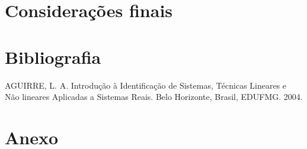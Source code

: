 \documentclass[a4paper, 12pt]{article}
\begin{document}
\newpage
\section{Considerações finais}
\newpage

\section*{Bibliografia}
\footnotesize{

\noindent AGUIRRE, L. A. Introdução à Identificação de Sistemas, Técnicas Lineares e Não lineares Aplicadas a Sistemas Reais. Belo Horizonte, Brasil, EDUFMG. 2004.\\

}
\newpage
{}
\section*{Anexo}
\end{document}
